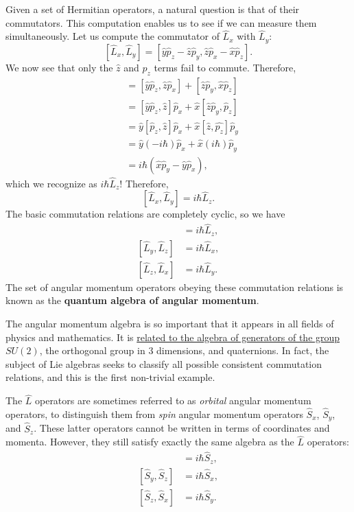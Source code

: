Given a set of Hermitian operators, a natural question is that of their commutators. This computation enables us to see if we can measure them simultaneously. Let us compute the commutator of $\hat{L}_x$ with $\hat{L}_y$: $$[\hat{L}_x,\hat{L}_y]=[\hat{y}\hat{p}_z-\hat{z}\hat{p}_y,\hat{z}\hat{p}_x-\hat{x}\hat{p}_z].$$We now see that only the $\hat{z}$ and $\hat{p}_z$ terms fail to commute. Therefore, \begin{align*}[\hat{L}_x,\hat{L}_y]&=[\hat{y}\hat{p}_z,\hat{z}\hat{p}_x]+[\hat{z}\hat{p}_y,\hat{x}\hat{p}_z]\\ &=[\hat{y}\hat{p}_z,\hat{z}]\hat{p}_x+\hat{x}[\hat{z}\hat{p}_y,\hat{p}_z] \\ &=\hat{y}[\hat{p}_z,\hat{z}]\hat{p}_x+\hat{x}[\hat{z},\hat{p_z}]\hat{p}_y \\ &=\hat{y}(-i\hbar)\hat{p}_x+\hat{x}(i\hbar)\hat{p}_y \\ &=i\hbar(\hat{x}\hat{p}_y-\hat{y}\hat{p}_x),\end{align*}which we recognize as $i\hbar\hat{L}_z$! Therefore, $$[\hat{L}_x,\hat{L}_y]=i\hbar\hat{L}_z.$$The basic commutation relations are completely cyclic, so we have \begin{align*}[\hat{L}_x,\hat{L}_y]&=i\hbar\hat{L}_z,\\ [\hat{L}_y,\hat{L}_z] &= i\hbar\hat{L}_x, \\ [\hat{L}_z,\hat{L}_x] &= i\hbar\hat{L}_y.\end{align*}
The set of angular momentum operators obeying these commutation relations is known as the \textbf{quantum algebra of angular momentum}. 

\begin{framedrmk*}
    The angular momentum algebra is so important that it appears in all fields of physics and mathematics. It is \href{https://www.sjsu.edu/faculty/watkins/SU2.htm}{related to the algebra of generators of the group $SU(2)$}, the orthogonal group in 3 dimensions, and quaternions. In fact, the subject of Lie algebras seeks to classify all possible consistent commutation relations, and this is the first non-trivial example.
\end{framedrmk*}

The $\hat{L}$ operators are sometimes referred to as \textit{orbital} angular momentum operators, to distinguish them from \textit{spin} angular momentum operators $\hat{S}_x$, $\hat{S}_y$, and $\hat{S}_z$. These latter operators cannot be written in terms of coordinates and momenta. However, they still satisfy exactly the same algebra as the $\hat{L}$ operators: \begin{align*}[\hat{S}_x,\hat{S}_y]&=i\hbar\hat{S}_z,\\ [\hat{S}_y,\hat{S}_z] &= i\hbar\hat{S}_x, \\ [\hat{S}_z,\hat{S}_x] &= i\hbar\hat{S}_y.\end{align*}

